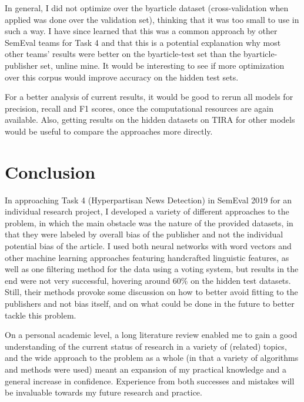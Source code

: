 \documentclass[11pt, a4paper]{article}
\begin{document}
In general, I did not optimize over the byarticle dataset (cross-validation when applied was done over the validation set), thinking that it was too small to use in such a way. I have since learned that this was a common approach by other SemEval teams for Task 4 and that this is a potential explanation why most other teams' results were better on the byarticle-test set than the byarticle-publisher set, unline mine. It would be interesting to see if more optimization over this corpus would improve accuracy on the hidden test sets.

For a better analysis of current results, it would be good to rerun all models for precision, recall and F1 scores, once the computational resources are again available. Also, getting results on the hidden datasets on TIRA for other models would be useful to compare the approaches more directly.

\section{Conclusion}

In approaching Task 4 (Hyperpartisan News Detection) in SemEval 2019 for an individual research project, I developed a variety of different approaches to the problem, in which the main obstacle was the nature of the provided datasets, in that they were labeled by overall bias of the publisher and not the individual potential bias of the article. I used both neural networks with word vectors and other machine learning approaches featuring handcrafted linguistic features, as well as one filtering method for the data using a voting system, but results in the end were not very successful, hovering around 60\% on the hidden test datasets. Still, their methods provoke some discussion on how to better avoid fitting to the publishers and not bias itself, and on what could be done in the future to better tackle this problem.

On a personal academic level, a long literature review enabled me to gain a good understanding of the current status of research in a variety of (related) topics, and the wide approach to the problem as a whole (in that a variety of algorithms and methods were used) meant an expansion of my practical knowledge and a general increase in confidence. Experience from both successes and mistakes will be invaluable towards my future research and practice.



\end{document}
